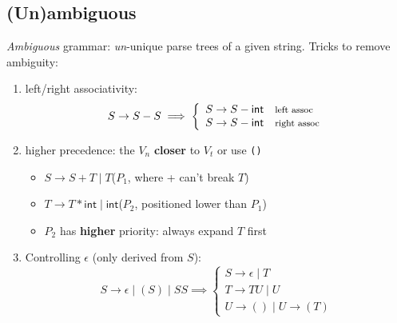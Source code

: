 \documentclass[10pt,a4paper,landscape]{article}
\newcommand{\gor}{\;|\;}
\begin{document}
\begin{multicols*}{3}
\section*{(Un)ambiguous}
\emph{Ambiguous} grammar: \emph{un}-unique parse trees of a given string. Tricks to remove ambiguity:
\begin{enumerate}
\item left/right associativity:
  \[
    S \rightarrow S - S \implies\left\{
      \begin{array}{l}
        S \rightarrow S - \mathsf{int}\quad \text{\footnotesize{left assoc}}\\
        S \rightarrow S - \mathsf{int}\quad \text{\footnotesize{right assoc}}
      \end{array}
       \right.
  \]
\item higher precedence: the \(V_{n}\) \textbf{closer} to \(V_{t}\) or use \verb|()|
  \begin{itemize}
    \item \(S \rightarrow S + T \gor T\)\hfill (\(P_{1} \), where + can't break \(T\))
    \item \(T \rightarrow T * \mathsf{int} \gor \mathsf{int}\)\hfill (\(P_{2}\), positioned lower than \(P_{1}\))
    \item[] \(P_{2}\) has \textbf{higher} priority: always expand \(T\) first
    \end{itemize}
\item Controlling \(\epsilon\) (only derived from \(S\)):
  \[
    S \rightarrow \epsilon \gor (S) \gor SS \implies\left\{
        \begin{array}{l}
          S \rightarrow \epsilon \gor T\\
          T \rightarrow TU \gor U\\
          U \rightarrow () \gor U \rightarrow (T)
        \end{array}
      \right.
  \]
\end{enumerate}

\end{multicols*}
\end{document}
